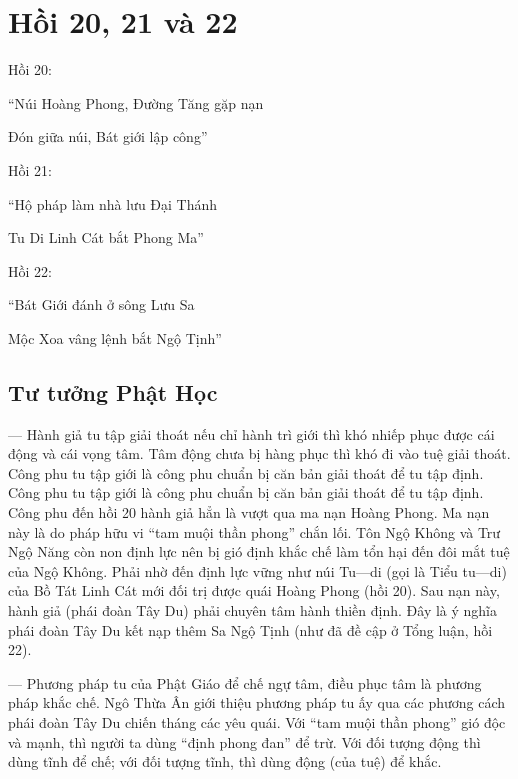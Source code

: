 \chapter{Hồi 20, 21 và 22} %
\label{cha:hoi_20_21_22}

Hồi 20:

\begin{itshape}
``Núi Hoàng Phong, Đường Tăng gặp nạn

Đón giữa núi, Bát giới lập công''
\end{itshape}

Hồi 21:

\begin{itshape}
``Hộ pháp làm nhà lưu Đại Thánh

Tu Di Linh Cát bắt Phong Ma''
\end{itshape}

Hồi 22:

\begin{itshape}
``Bát Giới đánh ở sông Lưu Sa

Mộc Xoa vâng lệnh bắt Ngộ Tịnh''
\end{itshape}

\section{Tư tưởng Phật Học} %
\label{sec:20_21_22_phat_hoc}

— Hành giả tu tập giải thoát nếu chỉ hành trì giới thì khó nhiếp phục được cái động và cái vọng tâm. Tâm động chưa bị hàng phục thì khó đi vào tuệ giải thoát. Công phu tu tập giới là công phu chuẩn bị căn bản giải thoát để tu tập định. Công phu tu tập giới là công phu chuẩn bị căn bản giải thoát để tu tập định. Công phu đến hồi 20 hành giả hẳn là vượt qua ma nạn Hoàng Phong. Ma nạn này là do pháp hữu vi ``tam muội thần phong'' chắn lối. Tôn Ngộ Không và Trư Ngộ Năng còn non định lực nên bị gió định khắc chế làm tổn hại đến đôi mắt tuệ của Ngộ Không. Phải nhờ đến định lực vững như núi Tu—di (gọi là Tiểu tu—di) của Bồ Tát Linh Cát mới đối trị được quái Hoàng Phong (hồi 20). Sau nạn này, hành giả (phái đoàn Tây Du) phải chuyên tâm hành thiền định. Đây là ý nghĩa phái đoàn Tây Du kết nạp thêm Sa Ngộ Tịnh (như đã đề cập ở Tổng luận, hồi 22).

— Phương pháp tu của Phật Giáo để chế ngự tâm, điều phục tâm là phương pháp khắc chế. Ngô Thừa Ân giới thiệu phương pháp tu ấy qua các phương cách phái đoàn Tây Du chiến tháng các yêu quái. Với ``tam muội thần phong'' gió độc và mạnh, thì người ta dùng ``định phong đan'' để trừ. Với đối tượng động thì dùng tĩnh để chế; với đối tượng tĩnh, thì dùng động (của tuệ) để khắc.

